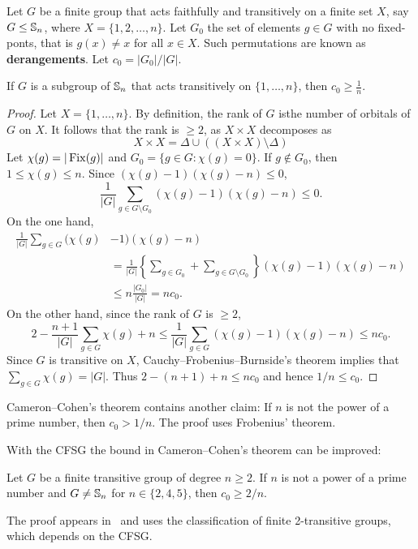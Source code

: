 
Let $G$ be a finite group that acts faithfully and transitively 
on a finite set $X$, say 
$G\leq\mathbb{S}_n$, where $X=\{1,2,\dots,n\}$. Let 
$G_0$ the set of elements $g\in G$ with no fixed-ponts, 
that is $g(x)\ne x$ for all $x\in X$. 
Such permutations are known as \textbf{derangements}. 
Let $c_0=|G_0|/|G|$. 

\begin{theorem}
    If $G$ is a subgroup of $\mathbb{S}_n$ that acts transitively on 
    $\{1,\dots,n\}$, then $c_0\geq\frac{1}{n}$.
\end{theorem}

\begin{proof}
    Let $X=\{1,\dots,n\}$. By definition, the rank of $G$ isthe number
    of orbitals of $G$ on $X$. It follows that the rank is $\geq2$, as
    $X\times X$ decomposes as 
    \[
    X\times X=\Delta\cup\left((X\times X)\setminus\Delta\right)
    \]
    Let $\chi(g)=|\operatorname{Fix}(g)|$ and $G_0=\{g\in G:\chi(g)=0\}$. If $g\not\in G_0$, then $1\leq\chi(g)\leq n$. Since  
    $(\chi(g)-1)(\chi(g)-n)\leq 0$,
    \[
    \frac{1}{|G|}\sum_{g\in G\setminus G_0}(\chi(g)-1)(\chi(g)-n)\leq 0.
    \]
    On the one hand, 
    \begin{align*}
    \frac{1}{|G|}\sum_{g\in G}(\chi(g)&-1)(\chi(g)-n)\\
    &=\frac{1}{|G|}\left\{\sum_{g\in G_0}+\sum_{g\in G\setminus G_0}\right\}(\chi(g)-1)(\chi(g)-n)\\
    &\leq n\frac{|G_0|}{|G|}=nc_0.
    \end{align*}
    On the other hand, since the rank of $G$ is $\geq2$, 
    \begin{equation}
        \label{eq:CameronCohen}
        2-\frac{n+1}{|G|}\sum_{g\in G}\chi(g)+n\leq 
        \frac{1}{|G|}\sum_{g\in G}(\chi(g)-1)(\chi(g)-n)\leq nc_0.
    \end{equation}
    Since $G$ is transitive on $X$, Cauchy--Frobenius--Burnside's theorem implies that
    $\sum_{g\in G}\chi(g)=|G|$. Thus $2-(n+1)+n\leq nc_0$ and hence
    $1/n\leq c_0$. 
\end{proof}

Cameron--Cohen's theorem contains another claim: If
$n$ is not the power of a prime number, then 
$c_0>1/n$. The proof uses Frobenius' theorem. 

With the CFSG the bound in Cameron--Cohen's theorem can be improved:

\begin{theorem}
    Let $G$ be a finite transitive group of degree $n\geq2$. If $n$ 
    is not a power of a prime number and 
    $G\ne\mathbb{S}_n$ for $n\in\{2,4,5\}$, then $c_0\geq 2/n$.
\end{theorem}

The proof appears in~\cite{MR1484879} and uses
the classification of finite 2-transitive groups, which depends on the CFSG. 



